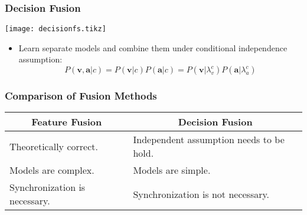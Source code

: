 \documentclass{beamer}
\begin{document}
  \begin{frame}
    \frametitle{Decision Fusion}

    \centering
    \texttt{[image: decisionfs.tikz]}

    \begin{itemize}
      \item Learn separate models and combine them under conditional independence assumption:
        \[ P(\mathbf{v},\mathbf{a}|c) = P(\mathbf{v}|c) P(\mathbf{a}|c) = P(\mathbf{v}|\lambda_v^c) P(\mathbf{a}|\lambda_a^c) \]
    \end{itemize}
  \end{frame}

  \begin{frame}
    \frametitle{Comparison of Fusion Methods}

    \centering
    \begin{tabular}{p{}|p{}}
      \hline
      \multicolumn{1}{c|}{\bfseries Feature Fusion} & \multicolumn{1}{c}{\bfseries Decision Fusion} \\ \hline
      Theoretically correct. & Independent assumption needs to be hold. \\
      Models are complex. & Models are simple. \\
      Synchronization is \mbox{necessary}. & Synchronization is not necessary. \\ \hline
    \end{tabular}

  \end{frame}
\end{document}
